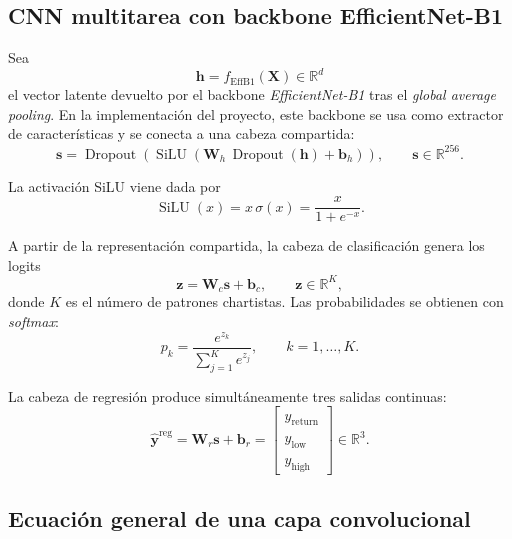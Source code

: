 \documentclass[11pt,a4paper]{article}
\begin{document}
\subsection{CNN multitarea con backbone EfficientNet-B1}

Sea
\begin{equation}
\mathbf{h} = f_{\mathrm{EffB1}}(\mathbf{X}) \in \mathbb{R}^{d}
\end{equation}
el vector latente devuelto por el backbone \textit{EfficientNet-B1} tras el \emph{global average pooling}. En la implementación del proyecto, este backbone se usa como extractor de características y se conecta a una cabeza compartida:
\begin{equation}
\mathbf{s} = \operatorname{Dropout}\!\left(\operatorname{SiLU}(\mathbf{W}_h\,\operatorname{Dropout}(\mathbf{h}) + \mathbf{b}_h)\right),
\qquad \mathbf{s}\in\mathbb{R}^{256}.
\end{equation}

La activación SiLU viene dada por
\begin{equation}
\operatorname{SiLU}(x)=x\,\sigma(x)=\frac{x}{1+e^{-x}}.
\end{equation}

A partir de la representación compartida, la cabeza de clasificación genera los logits
\begin{equation}
\mathbf{z}=\mathbf{W}_c\mathbf{s}+\mathbf{b}_c,
\qquad \mathbf{z}\in\mathbb{R}^{K},
\end{equation}
donde $K$ es el número de patrones chartistas. Las probabilidades se obtienen con \emph{softmax}:
\begin{equation}
 p_k = \frac{e^{z_k}}{\sum_{j=1}^{K}e^{z_j}},
 \qquad k=1,\dots,K.
\end{equation}

La cabeza de regresión produce simultáneamente tres salidas continuas:
\begin{equation}
\widehat{\mathbf{y}}^{\mathrm{reg}} = \mathbf{W}_r\mathbf{s}+\mathbf{b}_r
=\begin{bmatrix}
\widehat y_{\mathrm{return}} \\
\widehat y_{\mathrm{low}} \\
\widehat y_{\mathrm{high}}
\end{bmatrix}
\in \mathbb{R}^{3}.
\end{equation}

\subsection{Ecuación general de una capa convolucional}
\end{document}
